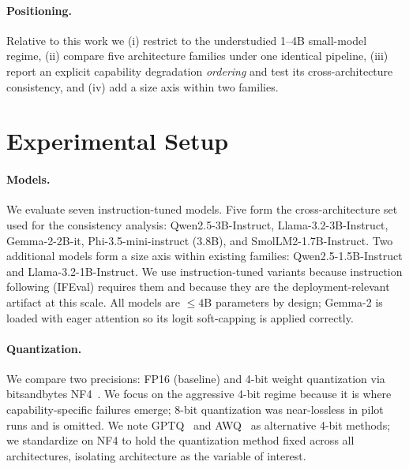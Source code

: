 \documentclass[11pt]{article}
\begin{document}
\paragraph{Positioning.} Relative to this work we (i) restrict to the understudied
1--4B small-model regime, (ii) compare five architecture families under one
identical pipeline, (iii) report an explicit capability degradation
\emph{ordering} and test its cross-architecture consistency, and (iv) add a size
axis within two families.

\section{Experimental Setup}
\label{sec:setup}

\paragraph{Models.} We evaluate seven instruction-tuned models. Five form the
cross-architecture set used for the consistency analysis: Qwen2.5-3B-Instruct,
Llama-3.2-3B-Instruct, Gemma-2-2B-it, Phi-3.5-mini-instruct (3.8B), and
SmolLM2-1.7B-Instruct. Two additional models form a size axis within existing
families: Qwen2.5-1.5B-Instruct and Llama-3.2-1B-Instruct. We use
instruction-tuned variants because instruction following (IFEval) requires them
and because they are the deployment-relevant artifact at this scale. All models
are $\leq 4$B parameters by design; Gemma-2 is loaded with eager attention so its
logit soft-capping is applied correctly.

\paragraph{Quantization.} We compare two precisions: FP16 (baseline) and 4-bit
weight quantization via bitsandbytes NF4~\citep{dettmers2022llmint8}. We focus on
the aggressive 4-bit regime because it is where capability-specific failures
emerge; 8-bit quantization was near-lossless in pilot runs and is omitted. We
note GPTQ~\citep{frantar2023gptq} and AWQ~\citep{lin2024awq} as alternative 4-bit
methods; we standardize on NF4 to hold the quantization method fixed across all
architectures, isolating architecture as the variable of interest.
\end{document}

